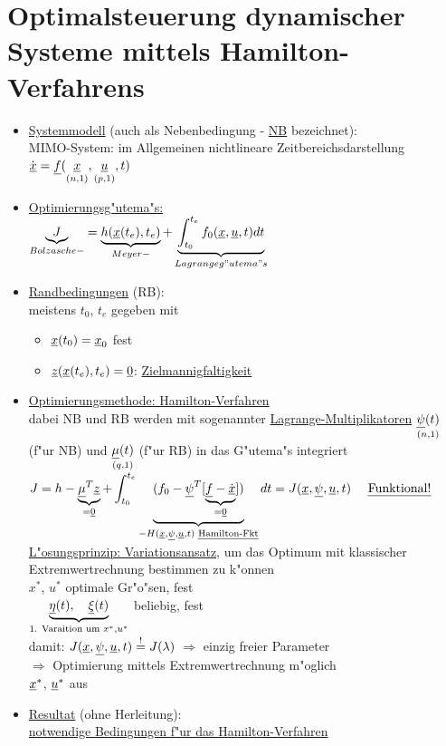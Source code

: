 \documentclass[openany,a4paper,11pt]{book}
\begin{document}
\section{Optimalsteuerung dynamischer Systeme mittels Hamilton-Verfahrens}
\begin{itemize}
    \item \uline{Systemmodell} (auch als Nebenbedingung - \uline{NB} bezeichnet):\\
    MIMO-System: im Allgemeinen nichtlineare Zeitbereichsdarstellung\\
    $\dot{\uline{x}}=\uline{f}(\mathop{\uline{x}}\limits_{(n,1)},\mathop{\uline{u}}\limits_{(p,1)},t)$
    \item \uline{Optimierungsg"utema"s:}\\
    $\underbrace{J}_{Bolzasche-}=\underbrace{h(\uline{x}(t_e),t_e)}_{Meyer-}+\underbrace{\int_{t_0}^{t_e} f_0 (\uline{x},\uline{u},t) dt}_{Lagrangeg"utema"s}$
    \item \uline{Randbedingungen} (RB):\\
    meistens $t_0$, $t_e$ gegeben mit\begin{itemize}
        \item $\uline{x}(t_0)=\uline{x}_0$ fest
        \item $\uline{z}(\uline{x}(t_e),t_e)=\uline{0}$: \quad  \uline{Zielmannigfaltigkeit}
    \end{itemize}
    \item \uline{Optimierungsmethode: Hamilton-Verfahren}\\
    dabei NB und RB werden mit sogenannter \uline{Lagrange-Multiplikatoren} $\mathop{\uline{\psi}(t)}\limits_{(n,1)}$ (f"ur NB) und $\mathop{\uline{\mu}(t)}\limits_{(q,1)}$ (f"ur RB) in das G"utema"s integriert\\
    $\displaystyle J=h-\underbrace{\uline{\mu}^T\uline{z}}_{=\uline{0}}+\int_{t_0}^{t_e}\underbrace{(f_0-\uline{\psi}^T[\underbrace{\uline{f}-\dot{\uline{x}}}_{=\uline{0}}])}_{-H(\uline{x},\uline{\psi},\uline{u},t)\text{ \uline{Hamilton-Fkt}}}dt=J(\uline{x},\uline{\psi},\uline{u},t)\quad\text{   \uline{Funktional!}}$\\
    \uline{L"osungsprinzip: Variationsansatz}, um das Optimum mit klassischer Extremwertrechnung bestimmen zu k"onnen\\
     \quad $x^*$, $u^*$ optimale Gr"o"sen, fest\\
     \quad $\underbrace{\uline{\eta}(t),\quad\uline{\xi}(t)}_{\text{1. Varaition um }x^*,u^*}$ beliebig, fest\\
    damit: $J(\uline{x},\uline{\psi},\uline{u},t)\stackrel{!}{=}J(\lambda)$ $\Rightarrow$ einzig freier Parameter\\ $\Rightarrow$ Optimierung mittels Extremwertrechnung m"oglich\\
    $\uline{x}^*$, $\uline{u}^*$ aus 
    \item \uline{Resultat} (ohne Herleitung): \\\uline{notwendige Bedingungen f"ur das Hamilton-Verfahren} 
\end{itemize}
\end{document}
